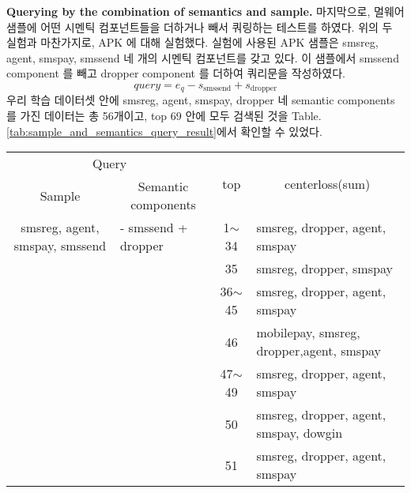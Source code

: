 \textbf{Querying by the combination of semantics and sample. }
마지막으로, 멀웨어 샘플에 어떤 시멘틱 컴포넌트들을 더하거나 빼서 쿼링하는 테스트를 하였다. 위의 두 실험과 마찬가지로, APK 에 대해 실험했다. 실험에 사용된 APK 샘플은 smsreg, agent, smspay, smssend 네 개의 시멘틱 컴포넌트를 갖고 있다. 이 샘플에서 smssend component 를 빼고 dropper component 를 더하여 쿼리문을 작성하였다. 
\[
   query = e_q - s_{\text{smssend}} + s_{\text{dropper}} 
\]
우리 학습 데이터셋 안에 smsreg, agent, smspay, dropper 네 semantic components 를 가진 데이터는 총 56개이고, top 69 안에 모두 검색된 것을 Table.\ref{tab:sample_and_semantics_query_result}에서 확인할 수 있었다.


 
\begin{table*}%
\caption{Querying by the combination of semantics and sample}
\label{tab:sample_and_semantics_query_result}
\begin{minipage}{\textwidth}
\begin{center}
\begin{tabular}{llcl}
\hline
\multicolumn{2}{c}{Query}                                                                    & \multirow{2}{*}{top} & \multicolumn{1}{c}{\multirow{2}{*}{centerloss(sum)}} \\
\multicolumn{1}{c}{Sample}                         & \multicolumn{1}{c}{Semantic components} &                      & \multicolumn{1}{c}{}                                 \\ \hline
\multicolumn{1}{c}{smsreg, agent, smspay, smssend} & - smssend + dropper                     & 1$\sim$34            & smsreg, dropper, agent, smspay                       \\
                                                   &                                         & 35                   & smsreg, dropper, smspay                              \\
                                                   &                                         & 36$\sim$45           & smsreg, dropper, agent, smspay                       \\
                                                   &                                         & 46                   & mobilepay, smsreg, dropper,agent, smspay             \\
                                                   &                                         & 47$\sim$49           & smsreg, dropper, agent, smspay                       \\
                                                   &                                         & 50                   & smsreg, dropper, agent, smspay, dowgin               \\
                                                   &                                         & 51                   & smsreg, dropper, agent, smspay                       \\ \hline
\end{tabular}
\end{center}
\bigskip\centering
\end{minipage}
\end{table*}%

